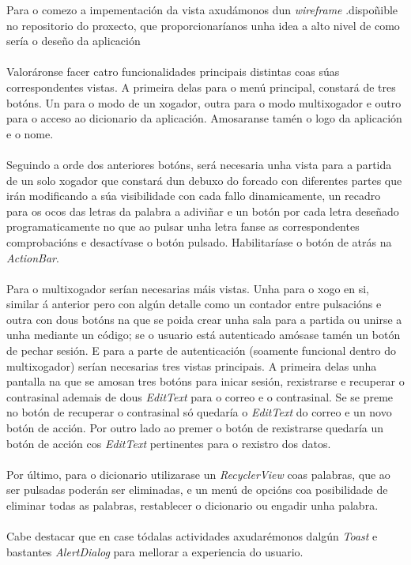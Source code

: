 Para o comezo a impementación da vista axudámonos dun \textit{wireframe} .dispoñible no repositorio do proxecto, que proporcionaríanos unha idea a alto nivel de como sería o deseño da aplicación\\
\\
Valoráronse facer catro funcionalidades principais distintas coas súas correspondentes vistas. A primeira delas para o menú principal, constará de tres botóns. Un para o modo de un xogador, outra para o modo multixogador e outro para o acceso ao dicionario da aplicación. Amosaranse tamén o logo da aplicación e o nome.\\
\\
Seguindo a orde dos anteriores botóns, será necesaria unha vista para a partida de un solo xogador que constará dun debuxo do forcado con diferentes partes que irán modificando a súa visibilidade con cada fallo dinamicamente, un recadro para os ocos das letras da palabra a adiviñar e un botón por cada letra deseñado programaticamente no que ao pulsar unha letra fanse as correspondentes comprobacións e desactívase o botón pulsado. Habilitaríase o botón de atrás na \textit{ActionBar}. \\
\\
Para o multixogador serían necesarias máis vistas. Unha para o xogo en si, similar á anterior pero con algún detalle como un contador entre pulsacións e outra con dous botóns na que se poida crear unha sala para a partida ou unirse a unha mediante un código; se o usuario está autenticado amósase tamén un botón de pechar sesión. E para a parte de autenticación (soamente funcional dentro do multixogador) serían necesarias tres vistas principais. A primeira delas unha pantalla na que se amosan tres botóns para inicar sesión, rexistrarse e recuperar o contrasinal ademais de dous \textit{EditText} para o correo e o contrasinal. Se se preme no botón de recuperar o contrasinal só quedaría o \textit{EditText} do correo e un novo botón de acción. Por outro lado ao premer o botón de rexistrarse quedaría un botón de acción cos \textit{EditText} pertinentes para o rexistro dos datos. \\
\\
Por último, para o dicionario utilizarase un \textit{RecyclerView} coas palabras, que ao ser pulsadas poderán ser eliminadas, e un menú de opcións coa posibilidade de eliminar todas as palabras, restablecer o dicionario ou engadir unha palabra.\\
\\
Cabe destacar que en case tódalas actividades axudarémonos dalgún \textit{Toast} e bastantes \textit{AlertDialog} para mellorar a experiencia do usuario.


